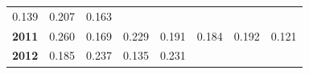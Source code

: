 \documentclass[]{article}
\begin{document}
\begin{longtable}[]{@{}rrrrrrrr@{}}
\begin{minipage}[t]{0.09\columnwidth}
0.139\strut
\end{minipage} & \begin{minipage}[t]{0.08\columnwidth}\raggedleft\strut
0.207\strut
\end{minipage} & \begin{minipage}[t]{0.10\columnwidth}\raggedleft\strut
0.163\strut
\end{minipage}\tabularnewline
\begin{minipage}[t]{0.08\columnwidth}\raggedleft\strut
\textbf{2011}\strut
\end{minipage} & \begin{minipage}[t]{0.10\columnwidth}\raggedleft\strut
0.260\strut
\end{minipage} & \begin{minipage}[t]{0.11\columnwidth}\raggedleft\strut
0.169\strut
\end{minipage} & \begin{minipage}[t]{0.08\columnwidth}\raggedleft\strut
0.229\strut
\end{minipage} & \begin{minipage}[t]{0.14\columnwidth}\raggedleft\strut
0.191\strut
\end{minipage} & \begin{minipage}[t]{0.09\columnwidth}\raggedleft\strut
0.184\strut
\end{minipage} & \begin{minipage}[t]{0.08\columnwidth}\raggedleft\strut
0.192\strut
\end{minipage} & \begin{minipage}[t]{0.10\columnwidth}\raggedleft\strut
0.121\strut
\end{minipage}\tabularnewline
\begin{minipage}[t]{0.08\columnwidth}\raggedleft\strut
\textbf{2012}\strut
\end{minipage} & \begin{minipage}[t]{0.10\columnwidth}\raggedleft\strut
0.185\strut
\end{minipage} & \begin{minipage}[t]{0.11\columnwidth}\raggedleft\strut
0.237\strut
\end{minipage} & \begin{minipage}[t]{0.08\columnwidth}\raggedleft\strut
0.135\strut
\end{minipage} & \begin{minipage}[t]{0.14\columnwidth}\raggedleft\strut
0.231\strut
\end{minipage} & \begin{minipage}[t]{0.09\columnwidth}\raggedleft\strut

\end{minipage}
\end{longtable}
\end{document}
